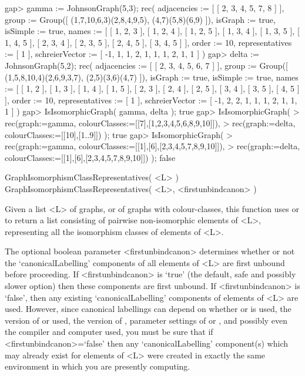 \beginexample
gap> gamma := JohnsonGraph(5,3);
rec( adjacencies := [ [ 2, 3, 4, 5, 7, 8 ] ], 
  group := Group([ (1,7,10,6,3)(2,8,4,9,5), (4,7)(5,8)(6,9) ]), 
  isGraph := true, isSimple := true, 
  names := [ [ 1, 2, 3 ], [ 1, 2, 4 ], [ 1, 2, 5 ], [ 1, 3, 4 ], [ 1, 3, 5 ], 
      [ 1, 4, 5 ], [ 2, 3, 4 ], [ 2, 3, 5 ], [ 2, 4, 5 ], [ 3, 4, 5 ] ], 
  order := 10, representatives := [ 1 ], 
  schreierVector := [ -1, 1, 1, 2, 1, 1, 1, 2, 1, 1 ] )
gap> delta := JohnsonGraph(5,2);
rec( adjacencies := [ [ 2, 3, 4, 5, 6, 7 ] ], 
  group := Group([ (1,5,8,10,4)(2,6,9,3,7), (2,5)(3,6)(4,7) ]), 
  isGraph := true, isSimple := true, 
  names := [ [ 1, 2 ], [ 1, 3 ], [ 1, 4 ], [ 1, 5 ], [ 2, 3 ], [ 2, 4 ], 
      [ 2, 5 ], [ 3, 4 ], [ 3, 5 ], [ 4, 5 ] ], order := 10, 
  representatives := [ 1 ], schreierVector := [ -1, 2, 2, 1, 1, 1, 2, 1, 1, 1 
     ] )
gap> IsIsomorphicGraph( gamma, delta );
true
gap> IsIsomorphicGraph( 
>       rec(graph:=gamma, colourClasses:=[[7],[1,2,3,4,5,6,8,9,10]]), 
>       rec(graph:=delta, colourClasses:=[[10],[1..9]]) ); 
true
gap> IsIsomorphicGraph( 
>       rec(graph:=gamma, colourClasses:=[[1],[6],[2,3,4,5,7,8,9,10]]), 
>       rec(graph:=delta, colourClasses:=[[1],[6],[2,3,4,5,7,8,9,10]]) ); 
false
\endexample


\>GraphIsomorphismClassRepresentatives( <L> )
\>GraphIsomorphismClassRepresentatives( <L>, <firstunbindcanon> )

Given a list <L> of graphs, or of graphs with colour-classes, this
function uses {\nauty} or {\bliss} to return a list consisting of pairwise
non-isomorphic elements of <L>, representing all the isomorphism classes
of elements of <L>.

The optional boolean parameter <firstunbindcanon> determines whether
or not the `canonicalLabelling' components of all elements of <L>
are first unbound before proceeding.  If <firstunbindcanon> is `true'
(the default, safe and possibly slower option) then these components
are first unbound.  If <firstunbindcanon> is `false', then any existing
`canonicalLabelling' components of elements of <L> are used.  However,
since canonical labellings can depend on whether {\nauty} or {\bliss} is
used, the version of {\nauty} or {\bliss} used, the version of {\GRAPE},
parameter settings of {\nauty} or {\bliss}, and possibly even the compiler
and computer used, you must be sure that if <firstunbindcanon>=`false'
then any `canonicalLabelling' component(s) which may already exist for
elements of <L> were created in exactly the same environment in which
you are presently computing.

